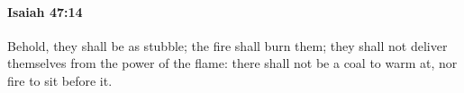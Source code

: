
		\paragraph{Isaiah 47:14} %
			\label{ISAIAH-47-14}

			Behold, they shall be as stubble; the fire shall burn them; they shall not deliver themselves from the power of the flame: there shall not be a coal to warm at, nor fire to sit before it.


